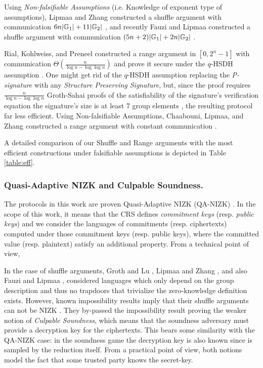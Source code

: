Using \emph{Non-falsifiable Assumptions} (i.e. Knowledge of exponent type of assumptions), Lipmaa and Zhang constructed a shuffle argument with communication $6n|\mathbb{G}_1|+11|\mathbb{G}_2|$ \cite{SCN:LipZha12}, and recently Fauzi and Lipmaa constructed a shuffle argument with communication $(5n+2)|\mathbb{G}_1|+2n|\mathbb{G}_2|$ \cite{EPRINT:FauLip15}.

Rial, Kohlweiss, and Preneel constructed a range argument in $[0,2^n-1]$ with communication $\Theta(\frac{n}{\log n -\log\log n})$ and prove it secure under the $q$-HSDH assumption \cite{PAIRING:RiaKohPre09}. One might get rid of the $q$-HSDH assumption replacing the \emph{P-signature} with any \emph{Structure Preserving Signature}, but, since the proof requires $\frac{n}{\log n-\log \log n}$ Groth-Sahai proofs of the satisfiability of the signature's verification equation the signature's size is at least 7 group elements \cite{C:KilPanWee15,C:LibPetYun15}, the resulting protocol far less efficient.
Using Non-falsifiable Assumptions, Chaabouni, Lipmaa, and Zhang constructed a range argument with constant communication \cite{FC:ChaLipZha12}. 

A detailed comparison of our Shuffle and Range arguments with the most efficient constructions under falsifiable assumptions is depicted in Table \ref{table:eff}.



\subsubsection{Quasi-Adaptive NIZK and Culpable Soundness.} The protocols in this work are proven Quasi-Adaptive NIZK (QA-NIZK) \cite{AC:JutRoy13}.
In the scope of this work, it means that the CRS defines \emph{commitment keys} (resp. \emph{public keys}) and we consider the languages of commitments (resp. ciphertexts) computed under those commitment keys (resp. public keys), where the committed value (resp. plaintext) satisfy an additional property. From a technical point of view, 

In the case of shuffle arguments, Groth and Lu \cite{AC:GroLu07}, Lipmaa and Zhang \cite{SCN:LipZha12}, and also Fauzi and Lipmaa \cite{EPRINT:FauLip15}, considered languages which only depend on the group description and thus no trapdoors that trivialize the zero-knowledge definition exists. However, known impossibility results imply that their shuffle arguments can not be NIZK \cite{TCC:AbeFeh07}. They by-passed the impossibility result proving the weaker notion of \emph{Culpable Soundness}, which means that the soundness adversary must provide a decryption key for the ciphertexts. This bears some similarity with the QA-NIZK case: in the soundness game the decryption key is also known since is sampled by the reduction itself. From a practical point of view, both notions model the fact that some trusted party knows the secret-key.

